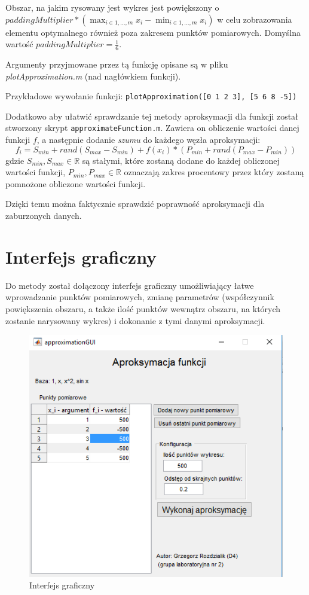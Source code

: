 \documentclass[12pt]{article}
\begin{document}
	Obszar, na jakim rysowany jest wykres jest powiększony o $paddingMultiplier * (\max_{i \in {1, \dots, m}} x_i - \min_{i \in {1, \dots, m}} x_i)$ w celu zobrazowania elementu optymalnego również poza zakresem punktów pomiarowych. Domyślna wartość $paddingMultiplier = \frac{1}{6}$.
	
	Argumenty przyjmowane przez tą funkcję opisane są w pliku \textit{plotApproximation.m} (nad nagłówkiem funkcji).
	
	Przykładowe wywołanie funkcji:
	\texttt{plotApproximation([0 1 2 3], [5 6 8 -5])}
	
	Dodatkowo aby ułatwić sprawdzanie tej metody aproksymacji dla funkcji został stworzony skrypt \texttt{approximateFunction.m}. Zawiera on obliczenie wartości danej funkcji $f$, a następnie dodanie \textit{szumu} do każdego węzła aproksymacji:
	$$
	f_i = S_{min} + rand(S_{max} - S_{min}) +  f(x_i) * (P_{min} + rand(P_{max} - P_{min}))
	$$
	gdzie $S_{min}, S_{max} \in \mathbb{R}$ są stałymi, które zostaną dodane do każdej obliczonej wartości funkcji, $P_{min}, P_{max} \in \mathbb{R}$ oznaczają zakres procentowy przez który zostaną pomnożone obliczone wartości funkcji.
	
	Dzięki temu można faktycznie sprawdzić poprawność aproksymacji dla zaburzonych danych.
	
	
	\section{Interfejs graficzny}
	Do metody został dołączony interfejs graficzny umożliwiający łatwe wprowadzanie punktów pomiarowych, zmianę parametrów (współczynnik powiększenia obszaru, a także ilość punktów wewnątrz obszaru, na których zostanie narysowany wykres) i dokonanie z tymi danymi aproksymacji.
	
	\begin{figure}[H]
		\centering
		\includegraphics[scale=1]{images/gui.png}
		\caption{Interfejs graficzny}
		\label{GUI}
	\end{figure}
	
\end{document}
